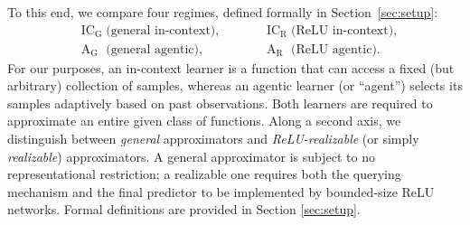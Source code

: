 \documentclass{article}
\newcommand{\ICG}{\mathrm{IC_G}}
\newcommand{\ICR}{\mathrm{IC_R}}
\newcommand{\AG}{\mathrm{A_G}}
\newcommand{\AR}{\mathrm{A_R}}
\begin{document}
To this end, we compare four regimes, defined formally in Section~\ref{sec:setup}:
\begin{align*}
&\ICG \;\text{(general in-context)},&
\qquad
&\ICR \;\text{(ReLU in-context)},\\
&\AG \,\,\;\text{(general agentic)},&
\qquad
&\AR \,\,\;\text{(ReLU agentic)}.
\end{align*}
For our purposes, an in-context learner is a function that can access a fixed (but arbitrary) collection of samples, whereas an agentic learner (or ``agent'') selects its samples adaptively based on past observations.
Both learners %
are required to approximate an entire given class of functions. 
Along a second axis, we distinguish between %
\emph{general} approximators and \emph{ReLU-realizable} (or simply \emph{realizable}) approximators. %
A general approximator is subject to no representational restriction; a realizable one requires both the querying mechanism and the final predictor to be implemented by bounded-size ReLU networks.
Formal definitions are provided in Section \ref{sec:setup}. 
\end{document}
